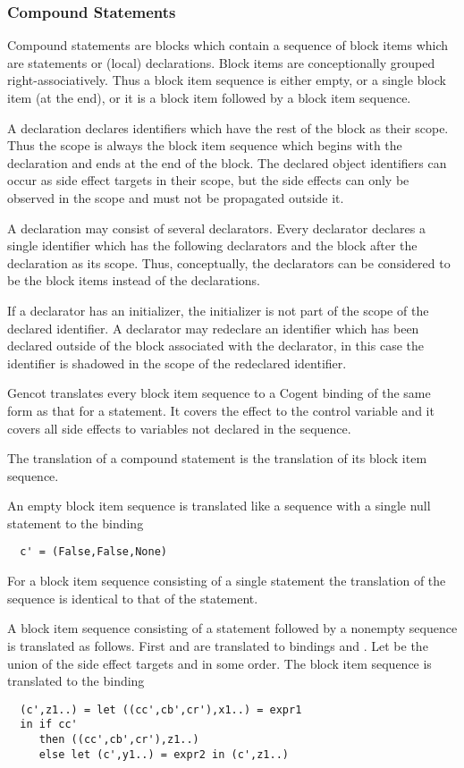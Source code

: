 \subsubsection{Compound Statements}

Compound statements are blocks which contain a sequence of block items which are statements or (local) declarations. Block items 
are conceptionally grouped right-associatively. Thus a block item sequence is either empty, or a single block item
(at the end), or it is a block item followed by a block item sequence.

A declaration declares identifiers which have the rest of the block as their scope. Thus the scope is always the block item sequence
which begins with the declaration and ends at the end of the block. The declared object identifiers can occur as side
effect targets in their scope, but the side effects can only be observed in the scope and must not be propagated outside it.

A declaration may consist of several declarators. Every declarator declares a single identifier which has the following declarators
and the block after the declaration as its scope. Thus, conceptually, the declarators can be considered to be the block items instead
of the declarations. 

If a declarator has an initializer, the initializer is not part of the scope of the declared identifier. A declarator may redeclare 
an identifier which has been declared outside of the block associated with the declarator, in this case the identifier is shadowed
in the scope of the redeclared identifier. 

Gencot translates every block item sequence to a Cogent binding of the same form as that for a statement. It covers the effect to 
the control variable and it covers all side effects to variables not declared in the sequence. 

The translation of a compound statement is the translation of its block item sequence.

An empty block item sequence is translated like a sequence with a single null statement to the
binding
\begin{verbatim}
  c' = (False,False,None)
\end{verbatim}

For a block item sequence consisting of a single statement the translation of the sequence is identical to that of the statement.

A block item sequence consisting of a statement  followed by a nonempty sequence  is translated as follows. First
 and  are translated 
to bindings  and . Let  be the union of the side effect targets 
 and  in some order. The block item sequence is translated to the binding
\begin{verbatim}
  (c',z1..) = let ((cc',cb',cr'),x1..) = expr1
  in if cc' 
     then ((cc',cb',cr'),z1..)
     else let (c',y1..) = expr2 in (c',z1..)
\end{verbatim}

